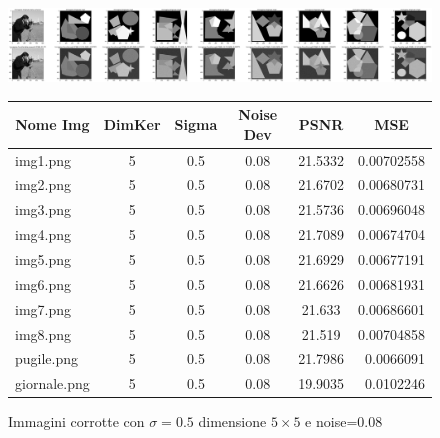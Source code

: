\begin{figure}[H]
    \centering
    \begin{minipage}[h]{\textwidth}
    \includegraphics[width=\linewidth]{output/tabCorrotte/imgcorr3.png}\label{fig:imgcorrotte3}
    \end{minipage}
    \begin{minipage}[h]{\textwidth}
        \centering
        
        \begin{tabular}{|l c c c c r|}
            \hline
            \multicolumn{1}{|c}{\textbf{Nome Img}} & \multicolumn{1}{|c}{\textbf{DimKer}} & \multicolumn{1}{|c}{\textbf{Sigma}} & \multicolumn{1}{|c}{\textbf{Noise Dev}} & \multicolumn{1}{|c}{\textbf{PSNR}} & \multicolumn{1}{|c|}{\textbf{MSE}} \\ \hline
                img1.png & 5 & 0.5 & 0.08 & 21.5332 & 0.00702558 \\
                img2.png & 5 & 0.5 & 0.08 & 21.6702 & 0.00680731 \\
                img3.png & 5 & 0.5 & 0.08 & 21.5736 & 0.00696048 \\
                img4.png & 5 & 0.5 & 0.08 & 21.7089 & 0.00674704 \\
                img5.png & 5 & 0.5 & 0.08 & 21.6929 & 0.00677191 \\
                img6.png & 5 & 0.5 & 0.08 & 21.6626 & 0.00681931 \\
                img7.png & 5 & 0.5 & 0.08 & 21.633 & 0.00686601 \\
                img8.png & 5 & 0.5 & 0.08 & 21.519 & 0.00704858 \\
                pugile.png & 5 & 0.5 & 0.08 & 21.7986 & 0.0066091\\
                giornale.png & 5 & 0.5 & 0.08 & 19.9035 & 0.0102246 \\ \hline
            \end{tabular}\label{tab:tabcorrotte3}
        
        \end{minipage}
    \captionsetup{labelformat=andtable}
    \caption{Immagini corrotte con $\sigma = 0.5$ dimensione $5 \times 5$ e noise=0.08}
\end{figure}

